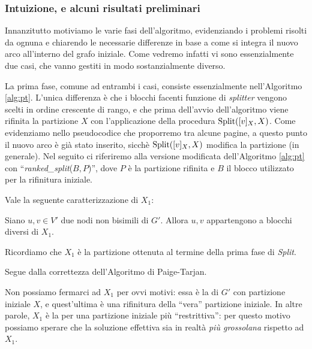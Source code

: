 \subsubsection{Intuizione, e alcuni risultati preliminari}
Innanzitutto motiviamo le varie fasi dell'algoritmo, evidenziando i problemi risolti da ognuna e chiarendo le necessarie differenze in base a come si integra il nuovo arco all'interno del grafo iniziale. Come vedremo infatti vi sono essenzialmente due casi, che vanno gestiti in modo sostanzialmente diverso.

La prima fase, comune ad entrambi i casi, consiste essenzialmente nell'Algoritmo \ref{alg:pt}. L'unica differenza è che i blocchi facenti funzione di \emph{splitter} vengono scelti in ordine crescente di rango, e che prima dell'avvio dell'algoritmo viene rifinita la partizione $X$ con l'applicazione della procedura $\textup{Split}([v]_X, X)$. Come evidenziamo nello pseudocodice che proporremo tra alcune pagine, a questo punto il nuovo arco è già stato inserito, sicchè $\textup{Split}([v]_X, X)$ modifica la partizione (in generale). Nel seguito ci riferiremo alla versione modificata dell'Algoritmo \ref{alg:pt} con ``\emph{ranked\_split}($B,P$)'', dove $P$ è la partizione rifinita e $B$ il blocco utilizzato per la rifinitura iniziale.

Vale la seguente caratterizzazione di $X_1$:

\begin{proposition}
    \label{prop:x1_prop}
    Siano $u,v \in V'$ due nodi non bisimili di $G'$. Allora $u,v$ appartengono a blocchi diversi di $X_1$.
\end{proposition}
Ricordiamo che $X_1$ è la partizione ottenuta al termine della prima fase di \emph{Split}.
\begin{proof2}
    Segue dalla correttezza dell'Algoritmo di Paige-Tarjan.
\end{proof2}

Non possiamo fermarci ad $X_1$ per ovvi motivi: essa è la \rscpnomath di $G'$ con partizione iniziale $X$, e quest'ultima è una rifinitura della ``vera'' partizione iniziale. In altre parole, $X_1$ è la \rscpnomath per una partizione iniziale più ``restrittiva'': per questo motivo possiamo sperare che la soluzione effettiva sia in realtà \emph{più grossolana} rispetto ad $X_1$.

